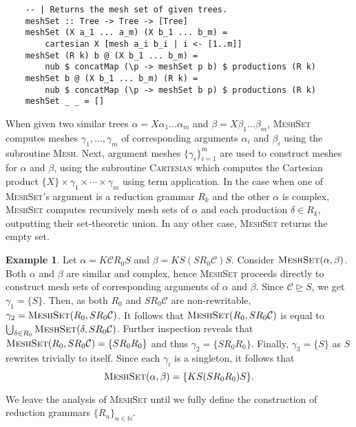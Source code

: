 \documentclass[11pt,a4paper]{amsart}
\theoremstyle{definition}
\newtheorem{example}[theorem]{Example}
\newcommand{\MeshSet}[2]{\textsc{MeshSet}(#1,#2)}
\begin{document}
\begin{lstlisting}
    -- | Returns the mesh set of given trees.
    meshSet :: Tree -> Tree -> [Tree]
    meshSet (X a_1 ... a_m) (X b_1 ... b_m) =
    	cartesian X [mesh a_i b_i | i <- [1..m]]
    meshSet (R k) b @ (X b_1 ... b_m) = 
    	nub $ concatMap (\p -> meshSet p b) $ productions (R k)
    meshSet b @ (X b_1 ... b_m) (R k) =
    	nub $ concatMap (\p -> meshSet b p) $ productions (R k)
    meshSet _ _ = []		
\end{lstlisting}

When given two similar trees $\alpha = X \alpha_1 \ldots \alpha_m$ and $\beta = X \beta_1 \ldots \beta_m$, \textsc{MeshSet} computes meshes $\gamma_1,\ldots,\gamma_m$ of corresponding arguments $\alpha_i$ and $\beta_i$ using the subroutine \textsc{Mesh}. Next, argument meshes $\{\gamma_i\}_{i = 1}^{m}$ are used to construct meshes for $\alpha$ and $\beta$, using the subroutine \textsc{Cartesian} which computes the Cartesian product $\{X\} \times \gamma_1 \times \cdots \times \gamma_m$ using term application.
In the case when one of \textsc{MeshSet}'s argument is a reduction grammar $R_k$ and the other $\alpha$ is complex, \textsc{MeshSet} computes recursively mesh sets of $\alpha$ and each production $\delta \in R_k$, outputting their set-theoretic union. In any other case, \textsc{MeshSet} returns the empty set.

\begin{example}
Let $\alpha = K \mathcal{C} R_0 S$ and $\beta = K S (S R_0 \mathcal{C}) S$. Consider $\MeshSet{\alpha}{\beta}$. Both $\alpha$ and $\beta$ are similar and complex, hence
\textsc{MeshSet} proceeds directly to construct mesh sets of corresponding arguments
of $\alpha$ and $\beta$. Since $\mathcal{C} \trianglerighteq S$, we get $\gamma_1 = \{S\}$. Then, as both $R_0$ and $S R_0 \mathcal{C}$ are non-rewritable, $\gamma_2 = \MeshSet{R_0}{S R_0 \mathcal{C}}$. It follows that $\MeshSet{R_0}{S R_0 \mathcal{C}}$
is equal to $\bigcup_{\delta \in R_0} \MeshSet{\delta}{S R_0 \mathcal{C}}$. Further inspection reveals that
$\MeshSet{R_0}{S R_0 \mathcal{C}} = \{S R_0 R_0\}$ and thus $\gamma_2 = \{S R_0 R_0\}$. Finally, $\gamma_3 = \{S\}$ as $S$ rewrites trivially to itself. Since each $\gamma_i$ is a singleton, it follows that
\[ \MeshSet{\alpha}{\beta} = \{K S (S R_0 R_0) S\}. \]
\end{example}

We leave the analysis of \textsc{MeshSet}  until we fully define the construction of reduction grammars ${\{R_n\}}_{n \in \mathbb{N}}$.
\end{document}
